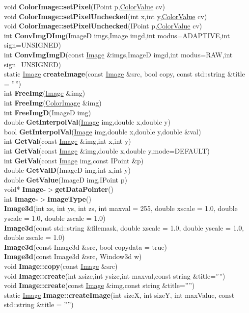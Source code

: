 \documentclass[10pt,titlepage]{article}
\def\functionlistentry#1#2#3#4#5#6{\noindent #1 {\bf #2}(#3) \dotfill #6\\}
\begin{document}
{{\functionlistentry{void}{ColorImage::setPixel}{IPoint p,\hyperlink{ColorValue}{ColorValue} cv}{49}{Images}{}
\functionlistentry{void}{ColorImage::setPixelUnchecked}{int x,int y,\hyperlink{ColorValue}{ColorValue} cv}{52}{Images}{}
\functionlistentry{void}{ColorImage::setPixelUnchecked}{IPoint p,\hyperlink{ColorValue}{ColorValue} cv}{53}{Images}{}
\functionlistentry{int}{ConvImgDImg}{ImageD imgs,\hyperlink{Image}{Image} imgd,int modus=ADAPTIVE,int sign=UNSIGNED}{85}{Images}{}
\functionlistentry{int}{ConvImgImgD}{const \hyperlink{Image}{Image} \&imgs,ImageD imgd,int modus=RAW,int sign=UNSIGNED}{86}{Images}{}
\functionlistentry{static \hyperlink{Image}{Image}}{createImage}{const \hyperlink{Image}{Image} \&src, bool copy, const std::string \&title = ''''}{9}{Images}{}
\functionlistentry{int}{FreeImg}{\hyperlink{Image}{Image} \&img}{12}{Images}{}
\functionlistentry{int}{FreeImg}{\hyperlink{ColorImage}{ColorImage} \&img}{24}{Images}{}
\functionlistentry{int}{FreeImgD}{ImageD img}{87}{Images}{}
\functionlistentry{double}{GetInterpolVal}{\hyperlink{Image}{Image} img,double x,double y}{69}{Images}{}
\functionlistentry{bool}{GetInterpolVal}{\hyperlink{Image}{Image} img,double x,double y,double \&val}{70}{Images}{}
\functionlistentry{int}{GetVal}{const \hyperlink{Image}{Image} \&img,int x,int y}{65}{Images}{}
\functionlistentry{int}{GetVal}{const \hyperlink{Image}{Image} \&img,double x,double y,mode=DEFAULT}{66}{Images}{}
\functionlistentry{int}{GetVal}{const \hyperlink{Image}{Image} img,const IPoint \&p}{68}{Images}{}
\functionlistentry{double}{GetValD}{ImageD img,int x,int y}{81}{Images}{}
\functionlistentry{double}{GetValue}{ImageD img,IPoint p}{83}{Images}{}
\functionlistentry{void*}{Image-$>$getDataPointer}{}{72}{Images}{}
\functionlistentry{int}{Image-$>$ImageType}{}{71}{Images}{}
\functionlistentry{}{Image3d}{int xs, int ys, int zs, int maxval = 255, double xscale = 1.0, double yscale = 1.0, double zscale = 1.0}{73}{Images}{}
\functionlistentry{}{Image3d}{const std::string \&filemask, double xscale = 1.0, double yscale = 1.0, double zscale = 1.0}{74}{Images}{}
\functionlistentry{}{Image3d}{const Image3d \&src, bool copydata = true}{75}{Images}{}
\functionlistentry{}{Image3d}{const Image3d \&src, Window3d w}{76}{Images}{}
\functionlistentry{void}{Image::copy}{const \hyperlink{Image}{Image} \&src}{7}{Images}{}
\functionlistentry{void}{Image::create}{int xsize,int ysize,int maxval,const string \&title=''''}{5}{Images}{}
\functionlistentry{void}{Image::create}{const \hyperlink{Image}{Image} \&img,const string \&title=''''}{6}{Images}{}
\functionlistentry{static \hyperlink{Image}{Image}}{Image::createImage}{int sizeX, int sizeY, int maxValue, const std::string \&title = ''''}{8}{Images}{}
}}
\end{document}
